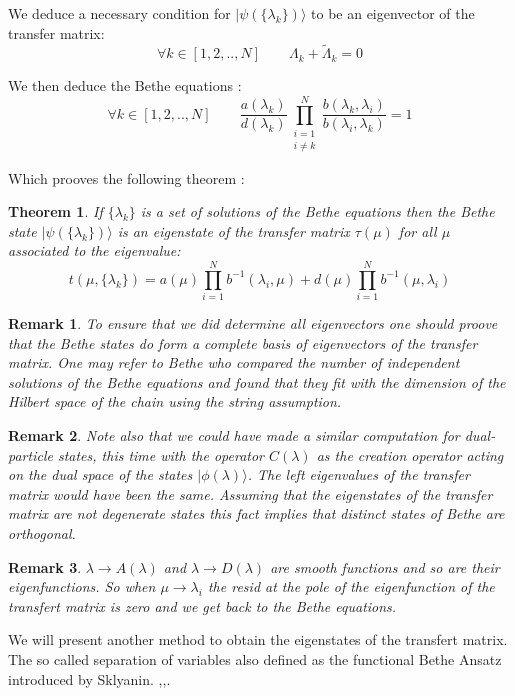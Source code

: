 \documentclass[12pt]{article}
\newtheorem{theo}{Theorem}[section]
\newtheorem{rem}{Remark}[section]
\begin{document}
We deduce a necessary condition for  $|\psi(\{\lambda_{k}\})\rangle$ to be an eigenvector of the transfer matrix:
\begin{equation}
\forall k\in [1,2,..,N] \qquad \Lambda_{k}+\widetilde{\Lambda}_{k}=0
\end{equation}

We then deduce the Bethe equations : 
\begin{equation}
\forall k \in [1,2,..,N]\qquad \frac{a(\lambda_k)}{d(\lambda_k)}\prod_{\substack{i=1\\ i\neq k}}^{N} \frac{b(\lambda_{k},\lambda_{i})}{b(\lambda_{i},\lambda_{k})}=1
\end{equation}

Which prooves the following theorem :
\begin{theo}

If $\{\lambda_{k}\} $ is a set of solutions of the Bethe equations then the Bethe state  $|\psi(\{\lambda_{k}\})\rangle$ is an eigenstate of the transfer matrix  $\tau(\mu)$ for all $\mu$ associated to the eigenvalue:
\begin{equation}
t(\mu,\{\lambda_{k}\})=a(\mu)\prod_{i=1}^{N}b^{-1}(\lambda_{i},\mu)+d(\mu)\prod_{i=1}^{N}b^{-1}(\mu,\lambda_{i})
\end{equation}
\end{theo}


\begin{rem}
To ensure that we did determine all eigenvectors one should proove that the Bethe states do form a complete basis of eigenvectors ​​of the transfer matrix. One may refer to Bethe \cite{Bet31} who compared the number of independent solutions of the Bethe equations  and found that they fit with the dimension of the Hilbert space of the chain using the string assumption. %
\end{rem}

\begin{rem}
Note also that we could have made a similar computation for dual-particle states, this time with the operator $ C(\lambda) $ as the creation operator acting on the dual space of the states $ |\phi({\lambda})\rangle $. The left eigenvalues of the transfer matrix ​​would have been the same. Assuming that the eigenstates of the transfer matrix are not degenerate states this fact implies that distinct states of Bethe are orthogonal.
\end{rem}

\begin{rem}
$\lambda\to A(\lambda)$ and $\lambda\to D(\lambda) $ are smooth functions and so are their eigenfunctions. So when $\mu \to \lambda_{i}$ the resid at the pole of the eigenfunction of the transfert matrix is zero and we get back to the Bethe equations.
\end{rem}
We will present another method to obtain the eigenstates of the transfert matrix. The so called separation of variables also defined as the functional Bethe Ansatz introduced by Sklyanin. \cite{Skl79},\cite{Skl90},\cite{Skl90}.
\end{document}
